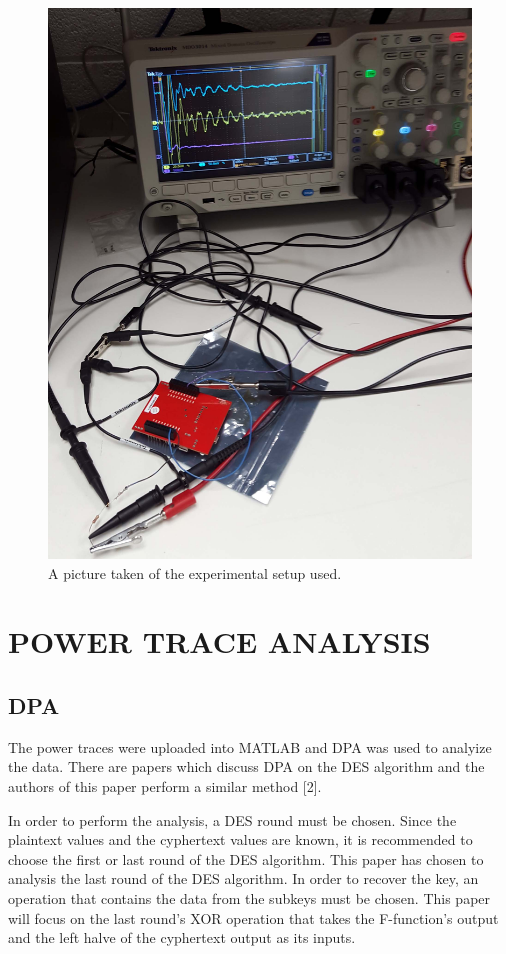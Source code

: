 \documentclass[letterpaper, 10 pt, conference]{ieeeconf}  %
\begin{document}
\begin{figure}[thpb]
	\centering
	\includegraphics[scale=.1]{setup}
    \caption{A picture taken of the experimental setup used.}
\end{figure} 

\section{POWER TRACE ANALYSIS}

\subsection{DPA}

The power traces were uploaded into MATLAB and DPA was used to analyize the data.  There are papers which discuss DPA on the DES algorithm and the authors of this paper perform a similar method [2].

In order to perform the analysis, a DES round must be chosen.  Since the plaintext values and the cyphertext values are known, it is recommended to choose the first or last round of the DES algorithm.  This paper has chosen to analysis the last round of the DES algorithm.  In order to recover the key, an operation that contains the data from the subkeys must be chosen.  This paper will focus on the last round's XOR operation that takes the F-function's output and the left halve of the cyphertext output as its inputs.
\end{document}
